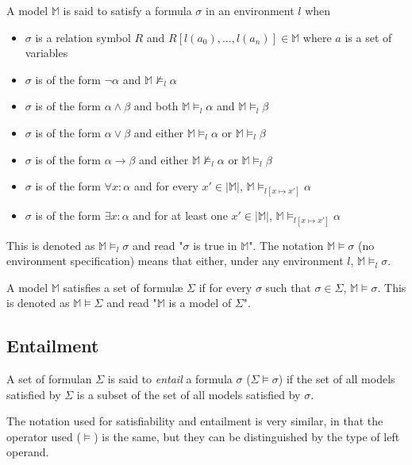 		A model $\mathbb{M}$ is said to satisfy a formula $\sigma$ in an
		environment $l$ when
		\begin{itemize}
		\item $\sigma$ is a relation symbol $R$ and $R[l(a_0) , \ldots , l(a_n)] \in \mathbb{M}$ where $a$ is a set of variables
		\item $\sigma$ is of the form $\neg\alpha$ and $\mathbb{M} \not\models_l \alpha$
		\item $\sigma$ is of the form $\alpha\wedge\beta$ and both $\mathbb{M} \models_l \alpha$ and $\mathbb{M} \models_l \beta$
		\item $\sigma$ is of the form $\alpha\vee\beta$ and either $\mathbb{M} \models_l \alpha$ or $\mathbb{M} \models_l \beta$
		\item $\sigma$ is of the form $\alpha\to\beta$ and either $\mathbb{M} \not\models_l \alpha$ or $\mathbb{M} \models_l \beta$
		\item $\sigma$ is of the form $\forall x : \alpha$  and for every $x' \in |\mathbb{M}|$, $\mathbb{M} \models_{l[x \mapsto x']} \alpha$
		\item $\sigma$ is of the form $\exists x : \alpha$  and for at least one $x' \in |\mathbb{M}|$, $\mathbb{M} \models_{l[x \mapsto x']} \alpha$
		\end{itemize}
		This is denoted as $\mathbb{M} \models_l \sigma$ and read "$\sigma$ is
		true in $\mathbb{M}$". The notation $\mathbb{M} \models \sigma$ (no
		environment specification) means that either, under any environment
		$l$, $\mathbb{M} \models_l \sigma$.

		A model $\mathbb{M}$ satisfies a set of formul{\ae} $\Sigma$ if for every
		$\sigma$ such that $\sigma \in \Sigma$, $\mathbb{M} \models \sigma$.
		This is denoted as $\mathbb{M} \models \Sigma$ and read "$\mathbb{M}$
		is a model of $\Sigma$".

	\subsection{Entailment}

		A set of formulan $\Sigma$ is said to \emph{entail} a formula $\sigma$
		($\Sigma \models \sigma$) if the set of all models satisfied by
		$\Sigma$ is a subset of the set of all models satisfied by $\sigma$.

		The notation used for satisfiability and entailment is very similar, in
		that the operator used ($\models$) is the same, but they can be
		distinguished by the type of left operand.

